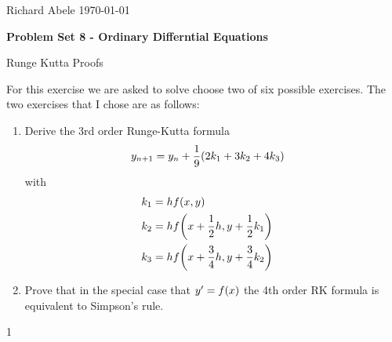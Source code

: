 \documentclass[12pt]{article}
\newenvironment{ex}[2][Exercise]{\begin{trivlist}
\item[\hskip \labelsep {\bfseries #1}\hskip \labelsep {\bfseries #2.}]}{\end{trivlist}}
\newenvironment{sol}[1][Solution]{\begin{trivlist}
\item[\hskip \labelsep {\bfseries #1:}]}{\end{trivlist}}
\DeclarePairedDelimiter\rb{(}{)}
\begin{document}
\noindent Richard Abele \hfill \today \\[30pt]
\centerline{ \Large{ \textbf{ Problem Set 8 - Ordinary Differntial Equations }}}

\begin{ex}
    1 Runge Kutta Proofs
\end{ex}

For this exercise we are asked to solve choose two of six possible exercises. The two exercises that I chose are as follows:

\begin{enumerate}[label=(\alph*)]
    \item Derive the 3rd order Runge-Kutta formula 
        \begin{align*}
            y_{n+1} & =  y_{n} + \frac{1}{9} \rb*{ 2 k_{1} + 3 k_{2} + 4 k_{3}}
        \end{align*}
        with
        \begin{align*}
            k_{1} & =  h f\rb*{x,y} &\\
            k_{2} & =  h f \rb*{x + \frac{1}{2} h, y + \frac{1}{2} k_{1}} &\\
            k_{3} & =  h f \rb*{ x + \frac{3}{4} h , y + \frac{3}{4} k_{2}}
        \end{align*}
    \item Prove that in the special case that \(y' = f\rb*{x}\) the 4th order RK formula is equivalent to Simpson's rule.
\end{enumerate}

\begin{sol} 1 \end{sol}
\end{document}
